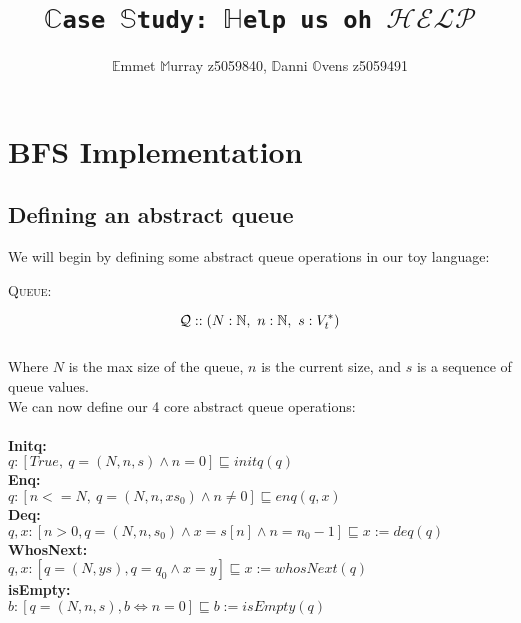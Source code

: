 \documentclass[a4paper]{scrartcl}
\title{\texttt{$\mathbb{C}$ase $\mathbb{S}$tudy: $\mathbb{H}$elp us oh $\mathcal{HELP}$}}
\author{$\mathbb{E}$mmet $\mathbb{M}$urray z5059840, $\mathbb{D}$anni $\mathbb{O}$vens z5059491}
\newcommand{\N}{\mathbb{N}}
\newcommand{\refinedby}{\sqsubseteq} %
\begin{document}
\maketitle
\section{BFS Implementation}
%
\subsection{Defining an abstract queue}
We will begin by defining some abstract queue operations in our toy language: \\
\begin{center}
{\LARGE{\textsc{Queue:}}\normalsize}
\end{center}
\begin{equation*}
\mathcal{Q} :: ( N:\N, ~n:\N, ~s:V_{t}^{*} ) \\
\end{equation*} \\
%
Where $N$ is the max size of the queue, $n$ is the current size, and $s$ is a sequence of queue values. \\
%
We can now define our 4 core abstract queue operations: \\ \\
%
\textbf{Initq:} \\
$q : [True, ~ q = ( N, n, s) \land n = 0] \refinedby initq(q)$ \\
\textbf{Enq:} \\
$q : [n <= N, ~ q = ( N, n, xs_0) \land n \neq 0] \refinedby enq(q, x)$ \\
\textbf{Deq:} \\
$q,x : [n > 0, q = (N, n, s_0) \land x = s[n] \land n = n_0 - 1] \refinedby x := deq(q)$ \\
\textbf{WhosNext:} \\
$q,x : [q = (N, ys), q = q_0 \land x = y] \refinedby x := whosNext(q)$ \\
\textbf{isEmpty:} \\
$b : [q = (N, n, s), b \iff n = 0 ] \refinedby b := isEmpty(q)$\\
%
\end{document}
